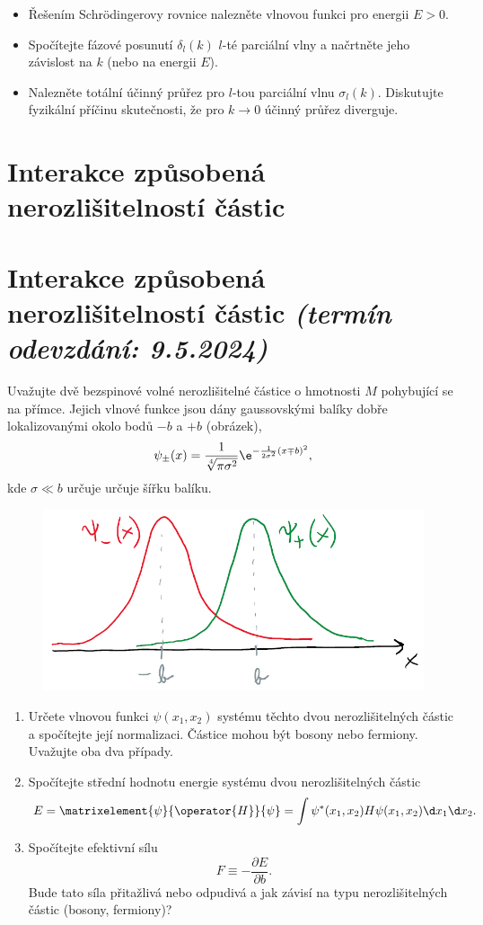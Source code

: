 \documentclass[a4paper,11pt,twoside]{book}
\def\np{\newpage}
\newcommand{\exercise}[2][]{\ifthenelse{\isempty{#1}}
	{\np\section{#2}}
	{\np\section[#2]{{#2} \small{\it{(termín odevzdání: {#1})}}}}
}
\begin{document}
    \begin{itemize}
        \item 
            Řešením Schrödingerovy rovnice nalezněte vlnovou funkci pro energii $E>0$.
            
        \item
            Spočítejte fázové posunutí $\delta_{l}(k)$ $l$-té parciální vlny 
            a načrtněte jeho závislost na $k$ (nebo na energii $E$).
            
        \item
            Nalezněte totální účinný průřez pro $l$-tou parciální vlnu $\sigma_{l}(k)$.
            Diskutujte fyzikální příčinu skutečnosti, že pro $k\rightarrow0$ účinný průřez diverguje.
    \end{itemize}    
    
\exercise[9.5.2024]{Interakce způsobená nerozlišitelností částic}
    Uvažujte dvě bezspinové volné nerozlišitelné částice o hmotnosti $M$ pohybující se na přímce.
    Jejich vlnové funkce jsou dány gaussovskými balíky dobře lokalizovanými okolo bodů $-b$ a $+b$ (obrázek),
    \begin{equation}
        \psi_{\pm}(x)=\frac{1}{\sqrt[4]{\pi\sigma^{2}}}\e^{-\frac{1}{2\sigma^{2}}(x\mp b)^{2}},
    \end{equation}
    kde $\sigma\ll b$ určuje určuje šířku balíku.
    
    \begin{figure}[htbp!]
        \centering
        \includegraphics[width=0.5\linewidth]{Identical.png}
    \end{figure}

    \begin{enumerate}
        \item 
            Určete vlnovou funkci $\psi(x_{1},x_{2})$ systému těchto dvou nerozlišitelných částic a spočítejte její normalizaci.
            Částice mohou být bosony nebo fermiony. 
            Uvažujte oba dva případy.
        
        \item Spočítejte střední hodnotu energie systému dvou nerozlišitelných částic
            \begin{equation}
                E=\matrixelement{\psi}{\operator{H}}{\psi}=\int\psi^{*}(x_{1},x_{2})H\psi(x_{1},x_{2})\d x_{1}\d x_{2}.
            \end{equation}

        \item Spočítejte efektivní sílu
            \begin{equation}
                F\equiv-\frac{\partial E}{\partial b}.
            \end{equation}
            Bude tato síla přitažlivá nebo odpudivá a jak závisí na typu nerozlišitelných částic (bosony, fermiony)?
    \end{enumerate}
\end{document}
